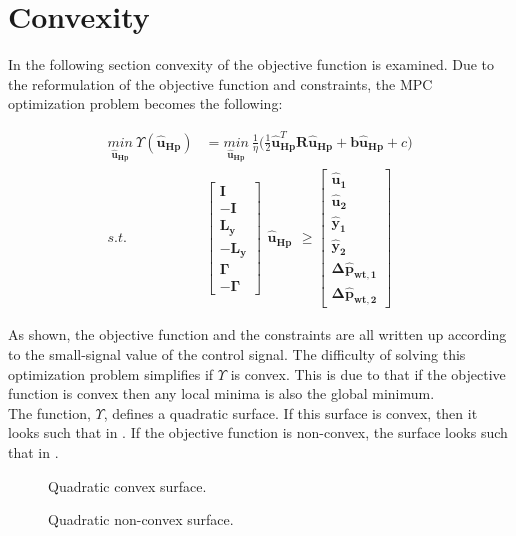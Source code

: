 \section{Convexity}
\label{convexity}
In the following section convexity of the objective function is examined. 
Due to the reformulation of the objective function and constraints, the MPC optimization problem becomes the following: 

\begin{align}
\underset{\bm{\hat{u}_{Hp}}}{min} \:  \Upsilon(\bm{\hat{u}}_{\bm{Hp}}) &= \underset{\bm{\hat{u}_{Hp}}}{min} \:  \frac{1}{\eta}\bigg( \frac{1}{2} \bm{\hat{u}}_{\bm{Hp}}^{T} \bm{R} \bm{\hat{u}}_{\bm{Hp}} + \bm{b} \bm{\hat{u}}_{\bm{Hp}} + c \bigg)\\
\label{eq:obj_final1}
%
s.t. \:\:\:\:\:	&\begin{bmatrix}
		\bm{I} 	\\
		-\bm{I} 	\\
		\bm{L_{y}}	\\
		-\bm{L_{y}}	\\
		\bm{\Gamma}	\\
		-\bm{\Gamma}
	\end{bmatrix}
	\begin{matrix}
			\bm{\hat{u}_{Hp}}
	\end{matrix}
	\geq 
	\begin{bmatrix}
			\bm{\hat{u}_{1}}	\\
			\bm{\hat{u}_{2}}	\\
			\bm{\hat{y}_{1}}	\\
			\bm{\hat{y}_{2}}	\\
			\bm{\Delta \hat{p}_{wt,1}}	\\
			\bm{\Delta \hat{p}_{wt,2}}	
	\end{bmatrix}
\end{align}

As shown, the objective function and the constraints are all written up according to the small-signal value of the control signal. The difficulty of solving this optimization problem simplifies if $\Upsilon$ is convex. This is due to that if the objective function is convex then any local minima is also the global minimum. 
\\
The function, $\Upsilon$, defines a quadratic surface. If this surface is convex, then it looks such that in . If the objective function is non-convex, the surface looks such that in . 

\begin{figure}[H]
  \centering
  \begin{minipage}[b]{0.45\textwidth}
     
    \caption{Quadratic convex surface.}
    \label{convexfig}
  \end{minipage}
  \hfill
  \begin{minipage}[b]{0.45\textwidth}
     
    \caption{Quadratic non-convex surface.}
    \label{nonconvexfig}
  \end{minipage}
  \label{fig:nonlinearpumps}
\end{figure}

